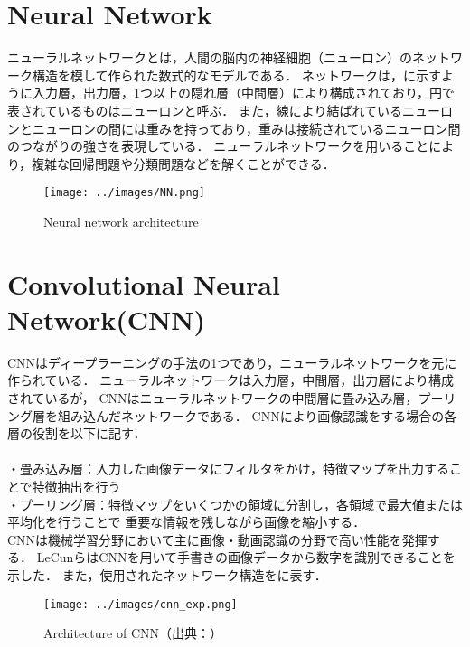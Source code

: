 \documentclass[../main]{subfiles}
\begin{document}
        \section{Neural Network}
        ニューラルネットワークとは，人間の脳内の神経細胞（ニューロン）のネットワーク構造を模して作られた数式的なモデルである．
        ネットワークは，に示すように入力層，出力層，1つ以上の隠れ層（中間層）により構成されており，円で表されているものはニューロンと呼ぶ．
        また，線により結ばれているニューロンとニューロンの間には重みを持っており，重みは接続されているニューロン間のつながりの強さを表現している．
        ニューラルネットワークを用いることにより，複雑な回帰問題や分類問題などを解くことができる．
        \begin{figure}[H]
         \centering
         \texttt{[image: ../images/NN.png]}
         \caption{Neural network architecture}
         \label{figure::NN}
        \end{figure}

        \newpage
        
        \section{Convolutional Neural Network(CNN)}
        CNNはディープラーニングの手法の1つであり，ニューラルネットワークを元に作られている．
        ニューラルネットワークは入力層，中間層，出力層により構成されているが，
        CNNはニューラルネットワークの中間層に畳み込み層，プーリング層を組み込んだネットワークである．
        CNNにより画像認識をする場合の各層の役割を以下に記す．\\\\
        ・畳み込み層：入力した画像データにフィルタをかけ，特徴マップを出力することで特徴抽出を行う\\
        ・プーリング層：特徴マップをいくつかの領域に分割し，各領域で最大値または平均化を行うことで
        重要な情報を残しながら画像を縮小する．\\


        CNNは機械学習分野において主に画像・動画認識の分野で高い性能を発揮する．
        LeCunら\cite{cnn_paper}はCNNを用いて手書きの画像データから数字を識別できることを示した．
        また，使用されたネットワーク構造をに表す．

        \begin{figure}[H]
         \centering
         \texttt{[image: ../images/cnn\_exp.png]}
         \caption{Architecture of CNN（出典：\cite{cnn_paper}）}
         \label{figure::cnn}
        \end{figure}
\end{document}
